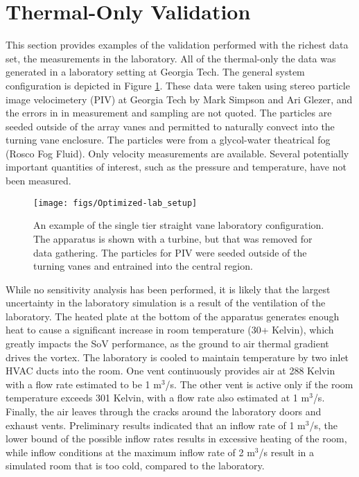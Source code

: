 \section{Thermal-Only Validation}
This section provides examples of the validation performed with the
richest data set, the measurements in the laboratory. All of the
thermal-only the data was generated in a laboratory setting at Georgia
Tech. The general system configuration is depicted in Figure
\ref{fig:lab_image}. These data were taken using stereo particle image
velocimetery (PIV) at Georgia Tech by Mark Simpson and Ari Glezer, and
the errors in in measurement and sampling are 
not quoted. The particles are seeded outside of the array vanes and
permitted to naturally convect into the turning vane enclosure. The
particles were from a glycol-water theatrical fog (Rosco Fog Fluid). 
Only velocity measurements are available. Several
potentially important quantities of interest, such as the pressure and
temperature, have not been measured. 

%
%
 \begin{figure}[!htb]
   \begin{center}
    \texttt{[image: figs/Optimized-lab\_setup]}
    \caption{An example of the single tier straight vane laboratory
    configuration. The apparatus is shown with a turbine, but that was
    removed for data gathering. The particles for PIV were seeded
    outside of the turning vanes and entrained into the central region.}
    \label{fig:lab_image}
   \end{center}
 \end{figure}

While no sensitivity analysis has been performed, it is likely that the
largest uncertainty in the laboratory simulation is a result of the
ventilation of the laboratory. The heated plate at the bottom of the
apparatus generates enough heat to cause a significant increase in room
temperature (30+ Kelvin), which greatly impacts the SoV
performance, as the ground to air thermal gradient drives the
vortex. The laboratory is cooled to maintain
temperature by two inlet HVAC ducts into the room. 
One vent continuously provides air at 288 Kelvin with a flow rate estimated 
to be 1 $\text{m}^3$/s.
The other vent is active only if the room temperature exceeds 301 Kelvin, 
with a flow rate also estimated at 1 $\text{m}^3$/s\cite{mark_comm}.
Finally, the air leaves through the cracks around the laboratory doors and 
exhaust vents. Preliminary results indicated that an inflow rate of 1
$\text{m}^3$/s, the lower bound of the possible inflow rates results in
excessive heating of the room, while inflow conditions at the maximum
inflow rate of 2 $\text{m}^3$/s result in a simulated room that is too cold,
compared to the laboratory.  

